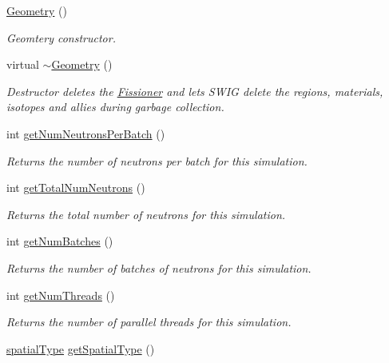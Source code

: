 \begin{DoxyCompactItemize}
\item 
\hyperlink{classGeometry_a4c301c163c63d21ed08c17b0f4e131d3}{Geometry} ()
\begin{DoxyCompactList}\small\item\em Geomtery constructor. \end{DoxyCompactList}\item 
\hypertarget{classGeometry_ad55e832122ab3a2833dcaa6507867678}{virtual \hyperlink{classGeometry_ad55e832122ab3a2833dcaa6507867678}{$\sim$\-Geometry} ()}\label{classGeometry_ad55e832122ab3a2833dcaa6507867678}

\begin{DoxyCompactList}\small\item\em Destructor deletes the \hyperlink{classFissioner}{Fissioner} and lets S\-W\-I\-G delete the regions, materials, isotopes and allies during garbage collection. \end{DoxyCompactList}\item 
int \hyperlink{classGeometry_add8ce27223fdd5f038cbbaa4f552a2c1}{get\-Num\-Neutrons\-Per\-Batch} ()
\begin{DoxyCompactList}\small\item\em Returns the number of neutrons per batch for this simulation. \end{DoxyCompactList}\item 
int \hyperlink{classGeometry_a1110957b5b8e1eafdd6f34ffa233d4d1}{get\-Total\-Num\-Neutrons} ()
\begin{DoxyCompactList}\small\item\em Returns the total number of neutrons for this simulation. \end{DoxyCompactList}\item 
int \hyperlink{classGeometry_af45e47614fc0b25fffd16528d17b296c}{get\-Num\-Batches} ()
\begin{DoxyCompactList}\small\item\em Returns the number of batches of neutrons for this simulation. \end{DoxyCompactList}\item 
int \hyperlink{classGeometry_a254abef4b1f2a48e6b75001856e4c233}{get\-Num\-Threads} ()
\begin{DoxyCompactList}\small\item\em Returns the number of parallel threads for this simulation. \end{DoxyCompactList}\item 
\hyperlink{Geometry_8h_af321382c4a8d9fdb71c83382f82fac00}{spatial\-Type} \hyperlink{classGeometry_ac64b1e5ebf43a9538952b20eaf07ef3b}{get\-Spatial\-Type} ()

\end{DoxyCompactItemize}
